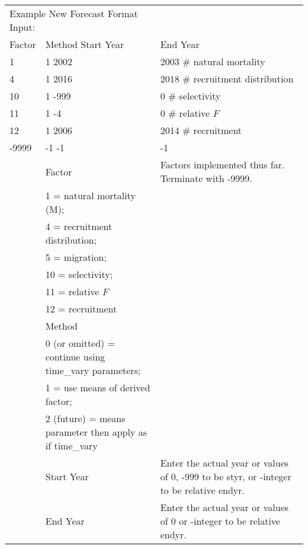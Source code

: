 \begin{landscape}
{\begin{longtable}{p{2cm} p{7cm} p{12cm}}
  \multicolumn{2}{l}{Example New Forecast Format Input:} & \\
  Factor & Method \hspace{15mm} Start Year & End Year \\
  1 & 1 \hspace{26mm} 2002 & 2003 \hspace{24mm} \# natural mortality \\
  4 & 1 \hspace{26mm} 2016 & 2018 \hspace{24mm} \# recruitment distribution \\ 
  10 & 1 \hspace{26mm} -999 & 0 \hspace{30mm} \# selectivity \\
  11 & 1 \hspace{26mm} -4 & 0 \hspace{30mm} \# relative $F$\\
  12 & 1 \hspace{26mm} 2006 & 2014 \hspace{24mm} \# recruitment\\
  -9999 & -1 \hspace{25mm} -1 & -1 \Bstrut\\

   & Factor & \multirow{1}{1cm}[-0.15cm]{\parbox{12cm}{Factors implemented thus far. Terminate with -9999.}} \\
   & 1 = natural mortality (M); & \\
   & 4 = recruitment distribution; & \\
   & 5 = migration; & \\
   & 10 = selectivity; & \\
   & 11 = relative $F$ & \\
   & 12 = recruitment & \\

   & Method & \Tstrut\\
   & 0 (or omitted) = continue using time\_vary parameters; & \\
   & 1 = use means of derived factor; & \\
   & 2 (future) = means parameter then apply as if time\_vary & \\
   & Start Year & Enter the actual year or values of 0, -999 to be styr, or -integer to be relative endyr. \\
   & End Year & Enter the actual year or values of 0 or -integer to be relative endyr. \\
  

\end{longtable}}
\end{landscape}
